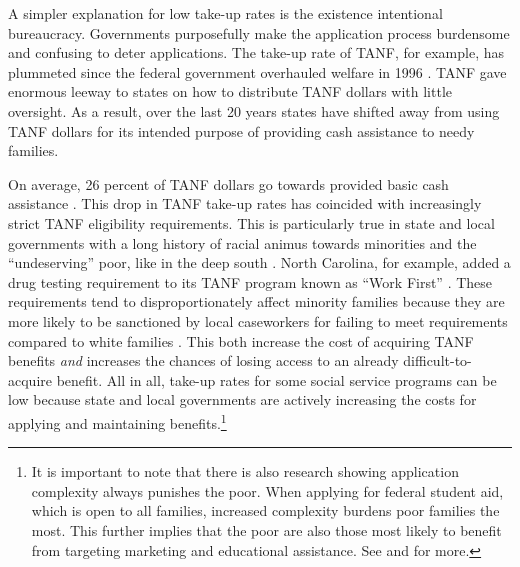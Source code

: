 \documentclass[12pt,letterpaperpaper,]{book}
\begin{document}
A simpler explanation for low take-up rates is the existence intentional
bureaucracy. Governments purposefully make the application process
burdensome and confusing to deter applications. The take-up rate of
TANF, for example, has plummeted since the federal government overhauled
welfare in 1996 \citep{ribar_how_2014}. TANF gave enormous leeway to
states on how to distribute TANF dollars with little oversight. As a
result, over the last 20 years states have shifted away from using TANF
dollars for its intended purpose of providing cash assistance to needy
families.

On average, 26 percent of TANF dollars go towards provided basic cash
assistance \citep{schott_how_2015}. This drop in TANF take-up rates has
coincided with increasingly strict TANF eligibility requirements. This
is particularly true in state and local governments with a long history
of racial animus towards minorities and the ``undeserving'' poor, like
in the deep south \citep{keiser_race_2004}. North Carolina, for example,
added a drug testing requirement to its TANF program known as ``Work
First'' \citep{lynn_bonner_nc_2016}. These requirements tend to
disproportionately affect minority families because they are more likely
to be sanctioned by local caseworkers for failing to meet requirements
compared to white families \citep{monnat_color_2010}. This both increase
the cost of acquiring TANF benefits \emph{and} increases the chances of
losing access to an already difficult-to-acquire benefit. All in all,
take-up rates for some social service programs can be low because state
and local governments are actively increasing the costs for applying and
maintaining benefits.\footnote{It is important to note that there is
  also research showing application complexity always punishes the poor.
  When applying for federal student aid, which is open to all families,
  increased complexity burdens poor families the most. This further
  implies that the poor are also those most likely to benefit from
  targeting marketing and educational assistance. See
  \citet{dynarski_cost_2006} and \citet{bertrand_behavioral_2006} for
  more.}
\end{document}
